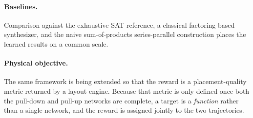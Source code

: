 \documentclass[11pt, a4paper]{article}
\theoremstyle{plain}
\theoremstyle{definition}
\theoremstyle{remark}
\begin{document}
\paragraph{Baselines.}
Comparison against the exhaustive SAT reference, a classical
factoring-based synthesizer, and the naive sum-of-products
series-parallel construction places the learned results on a common
scale.

\paragraph{Physical objective.}
The same framework is being extended so that the reward is a
placement-quality metric returned by a layout engine.  Because that
metric is only defined once both the pull-down and pull-up networks are
complete, a target is a \emph{function} rather than a single network, and
the reward is assigned jointly to the two trajectories.
\end{document}
